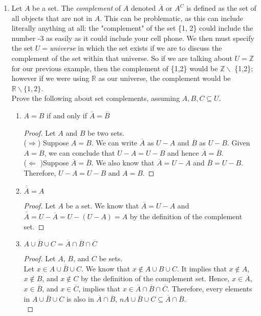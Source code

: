 \documentclass[12pt]{article}
\begin{document}
\begin{enumerate}
	\item 
Let $A$ be a set. The \emph{complement} of $A$ denoted $\overline{A}$ or $A^C$ is defined as the set of all objects that are not in $A$. This can be problematic, as this can include literally anything at all: the "complement" of the set \{1, 2\} could include the number -3 as easily as it could include your cell phone. We then must specify the set $U = $\emph{universe} in which the set exists if we are to discuss the complement of the set within that universe. So if we are talking about $U = \mathbb{Z}$ for our previous example, then the complement of \{1,2\} would be $\mathbb{Z} \backslash$ \{1,2\}; however if we were using $\mathbb{R}$ as our universe, the complement would be $\mathbb{R} \backslash \{1,2\}$.\\
	Prove the following about set complements, assuming $A, B, C \subseteq U$.
	\begin{enumerate}[label=(\alph*)]
		\item
		$A = B$ if and only if $\overline{A} = \overline{B}$
		\begin{proof}
			Let $A$ and $B$ be two sets.\\
			($\Rightarrow$) Suppose $A = B$. We can write $\overline{A}$ as $U - A$ and $\overline{B}$ as $U - B$. Given $A = B$, we can conclude that $U - A = U - B $ and hence $\overline{A} = \overline{B}$.\\
			($\Leftarrow$ )Suppose  $\overline{A} = \overline{B}$. We also know that $\overline{A} = U - A$ and $ \overline{B} = U - B $. Therefore, $U - A = U - B$ and $A=B$.
		\end{proof}
		
		\item
		$\overline{\overline{A}} = A$
		\begin{proof}
			Let $A$ be a set. We know that $\overline{A} = U - A$ and $\overline{\overline{A}} = U - \overline{A} = U - (U - A) =A$ by the definition of the complement set.
		\end{proof}
		
		\item
		$\overline{A \cup B \cup C} = \overline{A} \cap \overline{B} \cap \overline{C}$
		\begin{proof}
			Let $A$, $B$, and $C$ be sets.\\
			Let  $x\in \overline{A \cup B \cup C}$. We know that $x\notin A\cup B\cup C$. It implies that $x\notin A$, $x\notin B$, and $x\notin C$ by the definition of the complement set. Hence, $x\in \overline{A}$, $x\in \overline{B}$, and $x\in \overline{C}$, implies that $x\in  \overline{A} \cap \overline{B} \cap \overline{C}$. Therefore, every elements in $ \overline{A \cup B \cup C}$ is also in $\overline{A} \cap \overline{B}$, $ n \overline{A \cup B \cup C}\subseteq \overline{A} \cap \overline{B}$.\\
			

\end{proof}
\end{enumerate}
\end{enumerate}
\end{document}
